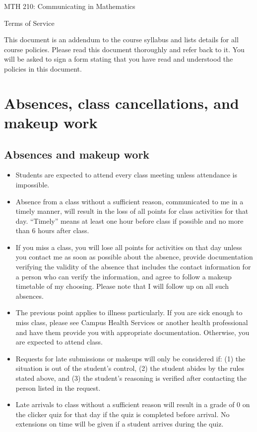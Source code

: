 \documentclass[11pt]{article}
\begin{document}
\begin{center}
	\begin{large}
		MTH 210: Communicating in Mathematics \\
	\end{large}
	Terms of Service 
\end{center}

This document is an addendum to the course syllabus and lists details for all course policies. Please read this document thoroughly and refer back to it. You will be asked to sign a form stating that you have read and understood the policies in this document. 

\section{Absences, class cancellations, and makeup work}

\subsection{Absences and makeup work}

\begin{itemize}[itemsep=0pt]
	\item Students are expected to attend every class meeting unless attendance is impossible. 
	\item Absence from a class without a sufficient reason, communicated to me in a timely manner, will result in the loss of all points for class activities for that day. ``Timely'' means at least one hour before class if possible and no more than 6 hours after class. 
	\item If you miss a class, you will lose all points for activities on that day unless you contact me as soon as possible about the absence, provide documentation verifying the validity of the absence that includes the contact information for a person who can verify the information, and agree to follow a makeup timetable of my choosing. Please note that I will follow up on all such absences. 
	\item The previous point applies to illness particularly. If you are sick enough to miss class, please see Campus Health Services or another health professional and have them provide you with appropriate documentation. Otherwise, you are expected to attend class. 
	\item Requests for late submissions or makeups will only be considered if: (1) the situation is out of the student's control, (2) the student abides by the rules stated above, and (3) the student's reasoning is verified after contacting the person listed in the request.
	\item Late arrivals to class without a sufficient reason will result in a grade of 0 on the clicker quiz for that day if the quiz is completed before arrival. No extensions on time will be given if a student arrives during the quiz. 
\end{itemize}
\end{document}
